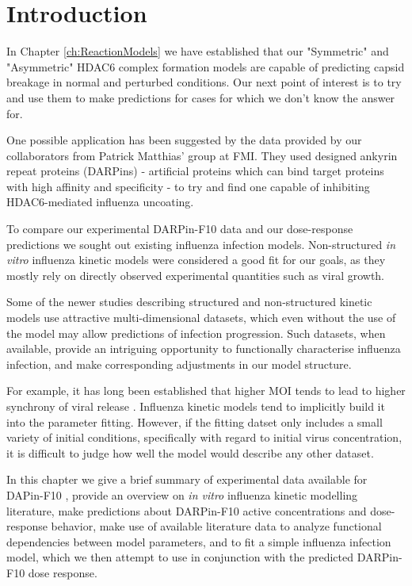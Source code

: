 \section{Introduction}


In Chapter \ref{ch:ReactionModels} we have established that our "Symmetric" and "Asymmetric" HDAC6 complex formation models are capable of predicting capsid breakage in normal and perturbed conditions. Our next point of interest is to try and use them to make predictions for cases for which we don't know the answer for.

One possible application has been suggested by the data provided by our collaborators from Patrick Matthias' group at FMI. They used designed ankyrin repeat proteins (DARPins) - artificial proteins which can bind target proteins with high affinity and specificity - to try and find one capable of inhibiting HDAC6-mediated influenza uncoating.

To  compare our experimental DARPin-F10 data and our dose-response predictions we sought out existing influenza infection models. Non-structured \textit{in vitro} influenza kinetic models were considered a good fit for our goals, as they mostly rely on directly observed experimental quantities such as viral growth.

Some of the newer studies describing structured and non-structured kinetic models \cite{rudiger2019multiscale, schulze2009infection} use attractive multi-dimensional datasets, which even without the use of the model may allow predictions of infection progression. Such datasets, when available, provide an intriguing opportunity to functionally characterise influenza infection, and make corresponding adjustments in our model structure.

For example, it has long been established that higher MOI tends to lead to higher synchrony of viral release \cite{cairns1957asynchrony}. Influenza kinetic models tend to implicitly build it into the parameter fitting. However, if the fitting datset only includes a small variety of initial conditions, specifically with regard to initial virus concentration, it is difficult to judge how well the model would describe any other dataset.

In this chapter we give a brief summary of experimental data available for DAPin-F10 \cite{DarpinData}, provide an overview on \textit{in vitro} influenza kinetic modelling literature, make predictions about DARPin-F10 active concentrations and dose-response behavior, make use of available literature data \cite{rudiger2019multiscale, schulze2009infection} to analyze functional dependencies between model parameters, and to fit a simple influenza infection model, which we then attempt to use in conjunction with the predicted DARPin-F10 dose response.


